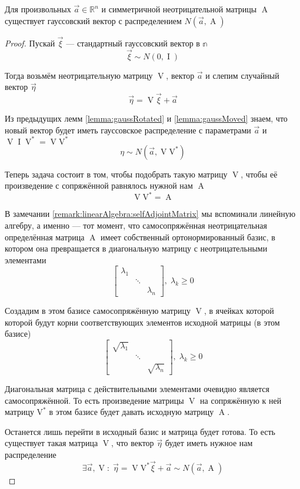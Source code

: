 \begin{theorem}\label{theorem:gaussianVectorExistance}
  Для произвольных $\vec{a} \in \mathbb{R}^n$ и симметричной неотрицательной
  матрицы $\operatorname{A}$ существует гауссовский вектор с распределением
  $N\left( \vec{a}, \operatorname{A} \right)$
\end{theorem}
\begin{proof}
  Пускай $\vec{\xi}$ --- стандартный гауссовский вектор в $\mathbb{n}$
  $$\vec{\xi} \sim N\left( 0, \operatorname{I} \right)$$

  Тогда возьмём неотрицательную матрицу $\operatorname{V}$, вектор $\vec{a}$ и
  слепим случайный вектор $\vec{\eta}$
  $$\vec{\eta} = \operatorname{V} \vec{\xi} + \vec{a}$$

  Из предыдущих лемм \ref{lemma:gaussRotated} и \ref{lemma:gaussMoved}
  знаем, что новый вектор будет иметь гауссовское распределение с параметрами
  $\vec{a}$ и $\operatorname{V} \operatorname{I} \operatorname{V}^* 
  = \operatorname{V} \operatorname{V^*} $
  $$\eta \sim N\left( \vec{a}, \operatorname{V} \operatorname{V^*} \right)$$

  Теперь задача состоит в том, чтобы подобрать такую матрицу $\operatorname{V}$,
  чтобы её произведение с сопряжённой равнялось нужной нам $\operatorname{A}$
  $$\operatorname{V} \operatorname{V^*} = \operatorname{A}$$

  В замечании \ref{remark:linearAlgebra:selfAdjointMatrix} мы вспоминали
  линейную алгебру, а именно --- тот момент, что самосопряжённая
  неотрицательная определённая матрица $\operatorname{A}$ имеет собственный
  ортонормированный базис, в котором она превращается в диагональную матрицу
  с неотрицательными элементами
  $$
  \begin{bmatrix}
      \lambda_1 & & \\
      & \ddots &  \\
      & & \lambda_n
  \end{bmatrix},\;
      \lambda_k \ge 0$$

  Создадим в этом базисе самосопряжённую матрицу $\operatorname{V}$, в ячейках
  которой которой будут корни соответствующих элементов исходной матрицы
  (в этом базисе)
  $$
  \begin{bmatrix}
      \sqrt{\lambda_1} & & \\
      & \ddots &  \\
      & & \sqrt{\lambda_n}
  \end{bmatrix},\; \lambda_k \ge 0$$

  Диагональная матрица с действительными элементами очевидно является
  самосопряжённой. То есть произведение матрицы $\operatorname{V}$ на
  сопряжённую к ней матрицу $\operatorname{V^*}$ в этом базисе будет давать
  исходную матрицу $\operatorname{A}$.

  Останется лишь перейти в исходный базис и матрица будет готова. То есть
  существует такая матрица $\operatorname{V}$, что вектор $\vec{\eta}$ будет
  иметь нужное нам распределение
  $$\exists \vec{a}, \operatorname{V}:\;
      \vec{\eta} = \operatorname{V} \operatorname{V^*} \vec{\xi} + \vec{a}
      \sim N\left( \vec{a}, \operatorname{A} \right)$$
\end{proof}

